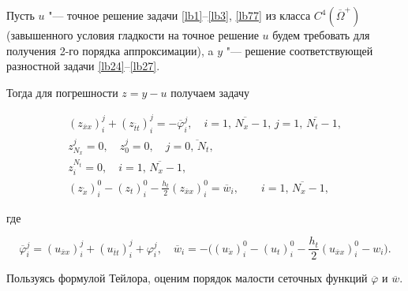 \smallskip




Пусть $u$ "--- точное решение задачи \eqref{lb1}--\eqref{lb3}, \eqref{lb77} из класса $C^4(\overline{\Omega}^{+})$ (завышенного условия гладкости на точное решение $u$ будем требовать для получения 2-го порядка аппроксимации), a $y$ "--- решение соответствующей разностной задачи \eqref{lb24}--\eqref{lb27}. 

Тогда для погрешности $z=y-u$ получаем задачу

\begin{gather}

\label{lb44}

\left(z_{\overline{x}x}\right)_{i}^{j}+\left(z_{\overline{t}t}\right)_{i}^{j}=-\overline{\varphi}_{i}^{j},\quad

i=\overline{1,\,N_x-1},\,j=\overline{1,\,N_t-1},

\\

\label{lb45}

z_{N_x}^{j}=0, \quad z_{0}^{j}=0,\quad j=\overline{0,\,N_t},

\\

\label{lb46}

z_{i}^{N_t}=0,\quad i=\overline{1,\,N_x-1},

\\

\label{lb47}

\left(z_{\mathring{x}}\right)_{i}^{0}-\left(z_{t}\right)_{i}^{0}-

\frac{h_t}{2} \left(z_{\overline{x}x}\right)_{i}^{0}=\overline{w}_i,\qquad i=\overline{1,\,N_x-1},

\end{gather}

где 

$$\overline{\varphi}_{i}^{j}=\left(u_{\overline{x}x}\right)_{i}^{j}+

\left(u_{\overline{t}t}\right)_{i}^{j}+\varphi_{i}^{j},

\quad 

\overline{w}_i=-\bigl(\left(u_{\mathring{x}}\right)_{i}^{0}-\left(u_{t}\right)_{i}^{0}-\frac{h_t}{2} \left(u_{\overline{x}x}\right)_{i}^{0}-w_i\bigr).

$$





Пользуясь формулой Тейлора, оценим порядок малости сеточных функций $\overline{\varphi}$ и $\overline{w}$. 

